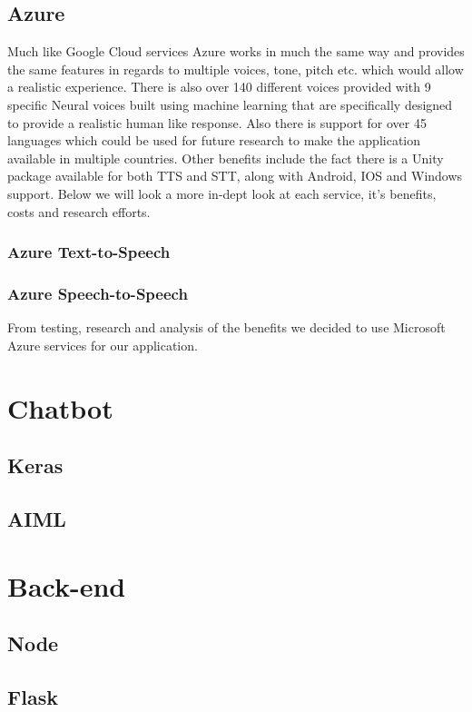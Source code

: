 \subsection{Azure}
Much like Google Cloud services Azure works in much the same way and provides the same features in regards to multiple voices, tone, pitch etc. which would allow a realistic experience. There is also over 140 different voices provided with 9 specific Neural voices built using machine learning that are specifically designed to provide a realistic human like response. Also there is support for over 45 languages which could be used for future research to make the application available in multiple countries. Other benefits include the fact there is a Unity package available for both TTS and STT, along with Android, IOS and Windows support. Below we will look a more in-dept look at each service, it's benefits, costs and research efforts.

\subsubsection{Azure Text-to-Speech}

\subsubsection{Azure Speech-to-Speech}

From testing, research and analysis of the benefits we decided to use Microsoft Azure services for our application.

\section{Chatbot}
\subsection{Keras}
\subsection{AIML}

\section{Back-end}
\subsection{Node}
\subsection{Flask}

